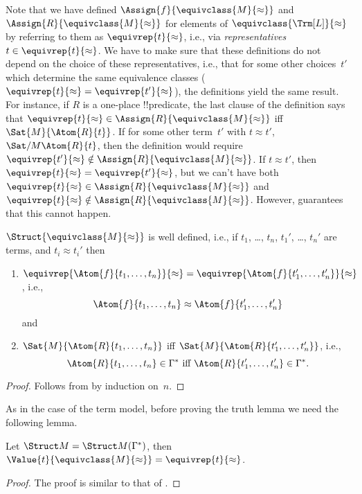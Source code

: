 \documentclass[../../../include/open-logic-section]{subfiles}
\begin{document}
\begin{explain}
Note that we have defined $\Assign{f}{\equivclass{M}{\approx}}$ and
$\Assign{R}{\equivclass{M}{\approx}}$ for elements of
$\equivclass{\Trm[L]}{\approx}$ by referring to them as
$\equivrep{t}{\approx}$, i.e., via \emph{representatives}~$t \in
\equivrep{t}{\approx}$.  We have to make sure that these definitions
do not depend on the choice of these representatives, i.e., that for
some other choices~$t'$ which determine the same equivalence classes
($\equivrep{t}{\approx} = \equivrep{t'}{\approx}$), the definitions
yield the same result. For instance, if $R$ is a one-place
!!{predicate}, the last clause of the definition says that
$\equivrep{t}{\approx} \in \Assign{R}{\equivclass{M}{\approx}}$ iff
$\Sat{M}{\Atom{R}{t}}$. If for some other term~$t'$ with $t \approx
t'$, $\Sat/{M}{\Atom{R}{t}}$, then the definition would require
$\equivrep{t'}{\approx} \notin \Assign{R}{\equivclass{M}{\approx}}$.
If $t \approx t'$, then $\equivrep{t}{\approx} =
\equivrep{t'}{\approx}$, but we can't have both $\equivrep{t}{\approx}
\in \Assign{R}{\equivclass{M}{\approx}}$ and $\equivrep{t}{\approx}
\notin \Assign{R}{\equivclass{M}{\approx}}$.  However,
 guarantees that this cannot happen.
\end{explain}

\begin{prop}
$\Struct{\equivclass{M}{\approx}}$ is well defined, i.e., if $t_1$,
  \dots, $t_n$, $t_1'$, \dots, $t_n'$ are terms, and $t_i \approx
  t_i'$ then
\begin{enumerate}
\item $\equivrep{\Atom{f}{t_1,\dots, t_n}}{\approx} =
    \equivrep{\Atom{f}{t_1',\dots, t_n'}}{\approx}$, i.e.,
  \[
  \Atom{f}{t_1,\dots, t_n} \approx \Atom{f}{t_1',\dots, t_n'}
  \]
  and
\item $\Sat{M}{\Atom{R}{t_1,\dots, t_n}}$ iff
  $\Sat{M}{\Atom{R}{t_1',\dots, t_n'}}$, i.e.,
  \[
    \Atom{R}{t_1,\dots, t_n} \in \Gamma^* \text{ iff }
    \Atom{R}{t_1',\dots, t_n'} \in \Gamma^*.
  \]
\end{enumerate}
\end{prop}

\begin{proof}
Follows from  by induction on~$n$.
\end{proof}

As in the case of the term model, before proving the truth lemma we need the
following lemma.

\begin{lem} 
 Let $\Struct M = \Struct M
 (\Gamma^*)$, then $\Value{t}{\equivclass{M}{\approx}} = \equivrep{t}
 {\approx}$.
\end{lem}
\begin{proof} 
The proof is similar to that of .
\end{proof}
\end{document}
